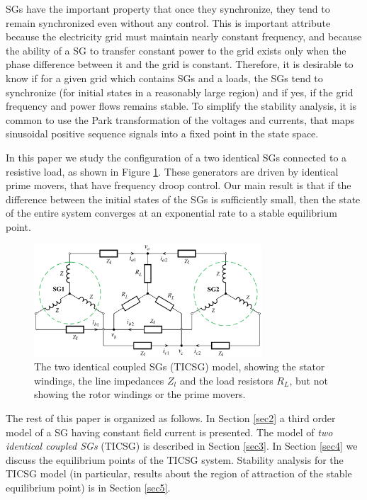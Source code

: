 \documentclass[letterpaper, 10 pt, conference]{ieeeconf}
\begin{document}
SGs have the important property that once they synchronize, they tend
to remain synchronized even without any control. This is important
attribute because the electricity grid must maintain nearly constant
frequency, and because the ability of a SG to transfer constant power
to the grid exists only when the phase difference between it and the
grid is constant. Therefore, it is desirable to know if for a given
grid which contains SGs and a loads, the SGs tend to synchronize (for
initial states in a reasonably large region) and if yes, if the grid
frequency and power flows remains stable. To simplify the stability
analysis, it is common to use the Park transformation of the voltages
and currents, that maps sinusoidal positive sequence signals into a
fixed point in the state space.

In this paper we study the configuration of a two identical SGs
connected to a resistive load, as shown in Figure
\ref{fig:TICSGThreePhase}. These generators are driven by identical
prime movers, that have frequency droop control. Our main result is
that if the difference between the initial states of the SGs is
sufficiently small, then the state of the entire system converges at
an exponential rate to a stable equilibrium point.

\begin{figure} %
\centering \includegraphics[width=8.5cm]{full_circuit_with_2_SGs}
\caption{The two identical coupled SGs (TICSG) model, showing the 
stator windings, the line impedances $Z_l$ and the load resistors 
$R_L$, but not showing the rotor windings or the prime movers.}
\label{fig:TICSGThreePhase}
\end{figure}

The rest of this paper is organized as follows. In Section \ref{sec2}
a third order model of a SG having constant field current is
presented. The model of {\em two identical coupled SGs} (TICSG) is
described in Section \ref{sec3}. In Section \ref{sec4} we discuss the 
equilibrium points of the TICSG system. Stability analysis for the
TICSG model (in particular, results about the region of attraction of
the stable equilibrium point) is in Section \ref{sec5}.
\end{document}
